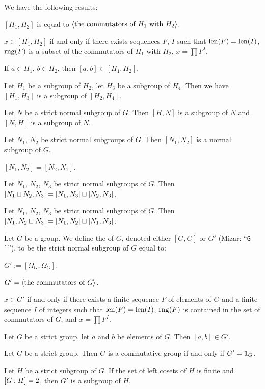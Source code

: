 \documentclass{article}
\begin{document}
We have the following results:
\begin{thm}
\item\label{group5:63} $[H_{1},H_{2}]$ is equal to $\langle\mbox{the commutators of $H_{1}$ with $H_{2}$}\rangle$.
\item\label{group5:64} $x\in[H_{1},H_{2}]$ if and only if there exists
  sequences $F$, $I$ such that $\operatorname{len}(F)=\operatorname{len}(I)$, $\operatorname{rng}(F)$ is a subset
  of the commutators of $H_{1}$ with $H_{2}$, $x=\prod F^{I}$.
\item\label{group5:65} If $a\in H_{1}$, $b\in H_{2}$, then $[a,b]\in[H_{1},H_{2}]$.
\item\label{group5:66} Let $H_{1}$ be a subgroup of $H_{2}$, let $H_{3}$
  be a subgroup of $H_{4}$. Then we have $[H_{1},H_{3}]$ is a subgroup
  of $[H_{2},H_{4}]$.
\item\label{group5:67} Let $N$ be a strict normal subgroup of $G$.
  Then $[H,N]$ is a subgroup of $N$ and $[N,H]$ is a subgroup of $N$.
\item\label{group5:68} Let $N_{1}$, $N_{2}$ be strict normal subgroups
  of $G$. Then $[N_{1},N_{2}]$ is a normal subgroup of $G$.
\item\label{group5:69} $[N_{1},N_{2}]=[N_{2},N_{1}]$.
\item\label{group5:70} Let $N_{1}$, $N_{2}$, $N_{3}$ be strict normal subgroups
  of $G$. Then $[N_{1}\sqcup N_{2},N_{3}]=[N_{1},N_{3}]\sqcup[N_{2},N_{3}]$.
\item\label{group5:71} Let $N_{1}$, $N_{2}$, $N_{3}$ be strict normal subgroups
  of $G$. Then $[N_{1},N_{2}\sqcup N_{3}]=[N_{1},N_{2}]\sqcup[N_{1},N_{3}]$.
\end{thm}

\begin{definition}
Let $G$ be a group. We define the  of $G$,
denoted either $[G,G]$ or $G'$ (Mizar: ``\verb#G `#''), to be the strict
normal subgroup of $G$ equal to:
\begin{defn}
\item $G' := [\Omega_{G},\Omega_{G}]$.
\end{defn}
\end{definition}

\begin{thm}
\item\label{group5:72} $G'=\langle\mbox{the commutators of $G$}\rangle$.
\item\label{group5:73} $x\in G'$ if and only if there exists a finite
  sequence $F$ of elements of $G$ and a finite sequence $I$ of integers
  such that $\operatorname{len}(F)=\operatorname{len}(I)$, $\operatorname{rng}(F)$ is contained in the set of
  commutators of $G$, and $x=\prod F^{I}$.
\item\label{group5:74} Let $G$ be a strict group, let $a$ and $b$ be
  elements of $G$. Then $[a,b]\in G'$.
\item\label{group5:75} Let $G$ be a strict group.
  Then $G$ is a commutative group if and only if $G'=\mathbf{1}_{G}$.
\item\label{group5:76} Let $H$ be a strict subgroup of $G$.
  If the set of left cosets of $H$ is finite and $[G : H]=2$,
  then $G'$ is a subgroup of $H$.
\end{thm}
\end{document}
